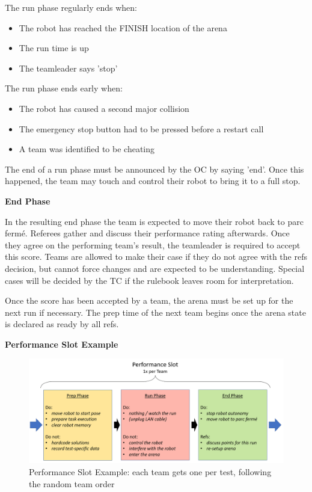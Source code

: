 \clearpage

The run phase regularly ends when:
\begin{itemize}
\item The robot has reached the FINISH location of the arena
\item The run time is up
\item The teamleader says 'stop'
\end{itemize}

The run phase ends early when:
\begin{itemize}
\item The robot has caused a second major collision
\item The emergency stop button had to be pressed before a restart call
\item A team was identified to be cheating 
\end{itemize}

The end of a run phase must be announced by the OC by saying 'end'.
Once this happened, the team may touch and control their robot to bring it to a full stop.

\textbf{End Phase}

In the resulting end phase the team is expected to move their robot back to parc ferm\'e.
Referees gather and discuss their performance rating afterwards.
Once they agree on the performing team's result, 
the teamleader is required to accept this score. 
Teams are allowed to make their case if they do not agree with the refs decision,
but cannot force changes and are expected to be understanding.
Special cases will be decided by the TC if the rulebook leaves room for interpretation.

Once the score has been accepted by a team,
the arena must be set up for the next run if necessary.
The prep time of the next team begins once the arena state is declared as ready by all refs.

\textbf{Performance Slot Example}

\begin{figure} [h!]
	\begin{center}
		\includegraphics[width= 0.9\linewidth]{./images/competition/performance_slot}
	\end{center}
	\caption{Performance Slot Example: each team gets one per test, following the random team order}
	\label{fig:performance slot example}
\end{figure}


